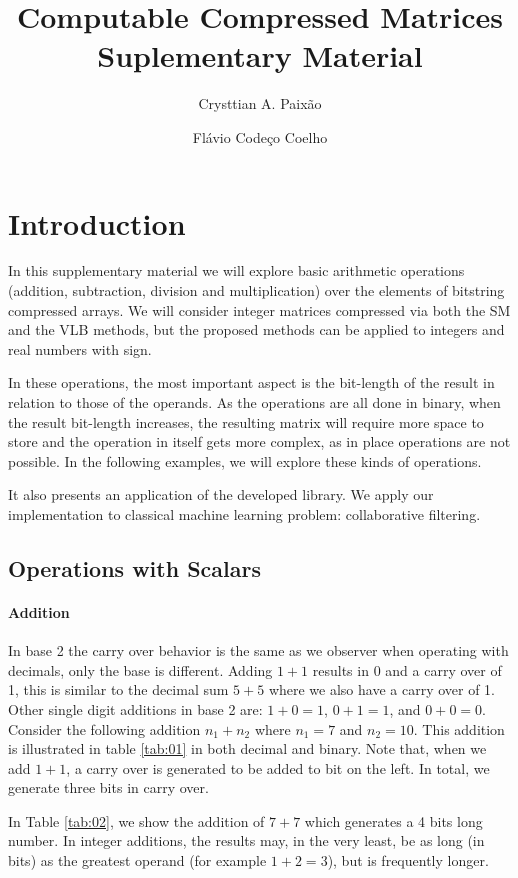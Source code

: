 \documentclass[10pt]{article}
\title{Computable Compressed Matrices\\Suplementary Material}
\author{Crysttian A. Paixão \and Flávio Codeço Coelho}
\begin{document}
\maketitle

\section{Introduction}

In this supplementary material we will explore basic arithmetic operations
(addition, subtraction, division and multiplication) over the elements of
bitstring compressed arrays. We will consider integer matrices compressed via
both the SM and the VLB methods, but the proposed 
methods can be applied to integers and real numbers with sign.

In these operations, the most important aspect is the bit-length of the result
in relation to those of the operands. As the operations are all done in
binary, when the result bit-length increases, the resulting matrix will require
more space to store and the operation in itself gets more complex, as in place
operations are not possible. In the following examples, we will explore these
kinds of operations.

It also presents an application of the developed library. We apply our 
implementation to classical machine learning problem: collaborative filtering.

\subsection{Operations with Scalars}

\paragraph{Addition}

In base 2 the carry over behavior is the same as we observer when operating
with decimals, only the base is different. Adding $1+1$ results in $0$ and a
carry over of 1, this is similar to the decimal sum $5+5$ where we also have a
carry over of 1. Other single digit additions in base 2 are: $1 + 0
= 1$, $0 + 1 = 1$, and $0 + 0 = 0$. Consider the following addition $n_1+n_2$
where $n_1=7$ and $n_2=10$. This addition is illustrated in table \ref{tab:01}
in both decimal and binary. Note that, when we add $1+1$, a carry over is
generated to be added to bit on the left. In total, we generate three bits in
carry over.

In Table \ref{tab:02}, we show the addition of $7 + 7$ which generates a 4 bits
long number. In integer additions, the results may, in the very least, be as
long (in bits) as the greatest operand (for example $1+2=3$), but is frequently
longer.
\end{document}
